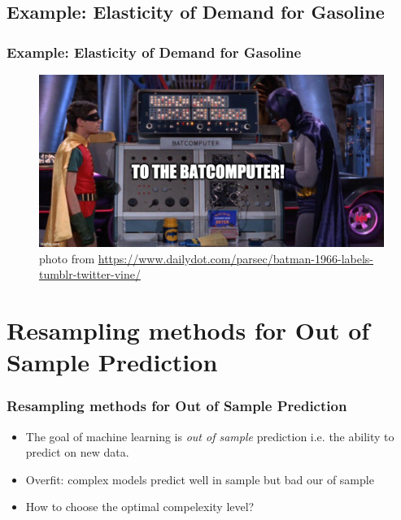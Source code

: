 \documentclass[
  shownotes,
  xcolor={svgnames},
  hyperref={colorlinks,citecolor=DarkBlue,linkcolor=andesred,urlcolor=DarkBlue}
  , aspectratio=169]{beamer}
\begin{document}
\subsection{Example: Elasticity of Demand for Gasoline}
\begin{frame}[fragile]
\frametitle{Example: Elasticity of Demand for Gasoline}
\begin{figure}[H] \centering
  \centering
  \includegraphics[scale=0.35]{figures/baticomputer_meme.jpg}
  \\
  \tiny photo from \url{https://www.dailydot.com/parsec/batman-1966-labels-tumblr-twitter-vine/}
\end{figure}

 \end{frame}

\section{Resampling methods for Out of Sample Prediction}
\begin{frame}[fragile]
\frametitle{Resampling methods for Out of Sample Prediction}




\begin{itemize}
   \item The  goal of machine learning is \emph{out of sample} prediction i.e. the ability to predict on new data.
  \medskip
  \item Overfit: complex models predict well in sample but bad our of sample 
  \medskip
  \item How to choose the optimal compelexity level?
\end{itemize}



\end{frame}
\end{document}
